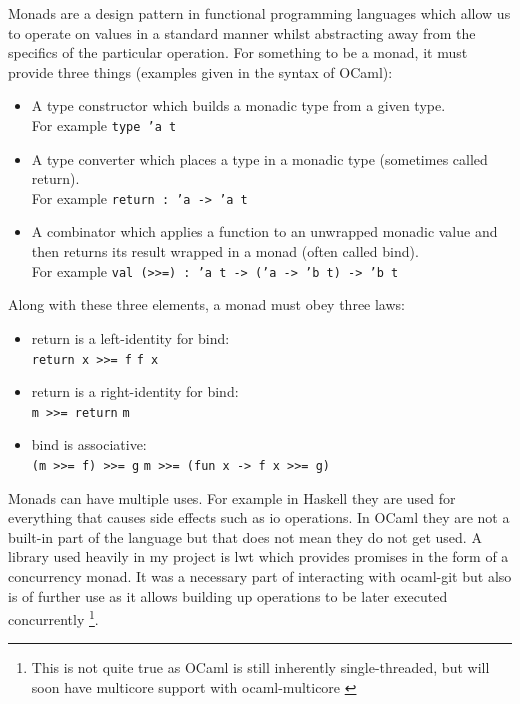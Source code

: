 Monads are a design pattern in functional programming languages which allow us to operate on values in a standard manner whilst abstracting away from the specifics of the particular operation. For something to be a monad, it must provide three things (examples given in the syntax of OCaml):

\begin{itemize}
\item A type constructor which builds a monadic type from a given type. \\
      For example \texttt{type 'a t}
\item A type converter which places a type in a monadic type (sometimes called return). \\
      For example \texttt{return : 'a -> 'a t}
\item A combinator which applies a function to an unwrapped monadic value and then returns its result wrapped in a monad (often called bind). \\
      For example \texttt{val (>>=) : 'a t -> ('a -> 'b t) -> 'b t}
\end{itemize}

Along with these three elements, a monad must obey three laws:

\begin{itemize}
\item return is a left-identity for bind: \\
      \texttt{return x >>= f} \texttt{f x}
\item return is a right-identity for bind: \\
      \texttt{m >>= return} \texttt{m}
\item bind is associative: \\
      \texttt{(m >>= f) >>= g} \texttt{m >>= (fun x -> f x >>= g)}
\end{itemize}

Monads can have multiple uses. For example in Haskell they are used for everything that causes side effects such as io operations. In OCaml they are not a built-in part of the language but that does not mean they do not get used. A library used heavily in my project is lwt \cite{lwt_library} which provides promises in the form of a concurrency monad. It was a necessary part of interacting with ocaml-git but also is of further use as it allows building up operations to be later executed concurrently \footnote{This is not quite true as OCaml is still inherently single-threaded, but will soon have multicore support with ocaml-multicore \cite{ocaml-multicore}}.

